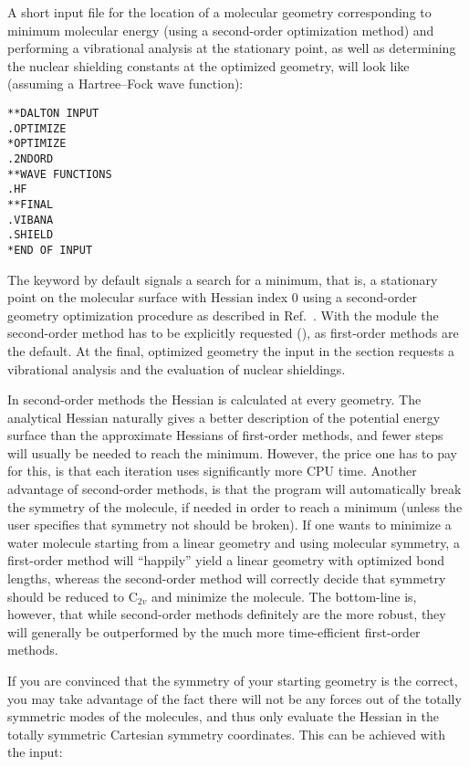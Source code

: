 A short input file for the location of a molecular geometry
corresponding to minimum molecular energy
(using a second-order optimization
method) and performing a vibrational
analysis at the stationary point, as well
as determining the nuclear
shielding constants at the optimized
geometry, will look like
(assuming a Hartree--Fock wave function):

\begin{verbatim}
**DALTON INPUT
.OPTIMIZE
*OPTIMIZE
.2NDORD
**WAVE FUNCTIONS
.HF
**FINAL
.VIBANA
.SHIELD
*END OF INPUT
\end{verbatim}

The keyword  by default signals a search for a minimum,
that is, a stationary point on the molecular surface with Hessian
index 0 using a second-order geometry optimization procedure as
described in Ref.~\cite{tuhjahjajpjjcp84}. With the 
module the second-order method has to be explicitly requested
(), as first-order methods are the default. At the final,
optimized geometry the input in the  section requests a
vibrational analysis and the evaluation of nuclear shieldings.

In second-order methods the Hessian is calculated at every
geometry. The analytical Hessian naturally gives a better description
of the potential energy surface than the approximate Hessians of
first-order methods, and fewer steps will usually be needed to reach
the minimum. However, the price one has to pay for this, is that each
iteration uses significantly more CPU time. Another advantage of
second-order methods, is that the program will automatically break the
symmetry of the molecule, if needed in order
to reach a minimum
(unless the user specifies that symmetry not should be broken). If
one wants to minimize a water molecule starting from a linear
geometry and using molecular symmetry, a first-order method will
``happily'' yield a linear geometry with optimized bond lengths, whereas
the second-order method will correctly decide that symmetry should be
reduced to C$_{2v}$ and minimize the molecule.
The bottom-line is, however, that while second-order methods
definitely are the more robust, they will generally be outperformed by
the much more time-efficient first-order methods.

If you are convinced that the symmetry of your starting geometry
is the correct, you may take advantage of the fact there will not
be any forces out of the totally symmetric modes of the molecules,
and thus only evaluate the Hessian in the totally symmetric
Cartesian symmetry coordinates. This can be achieved with the
input:

